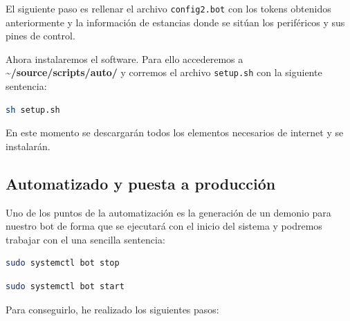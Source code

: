 El siguiente paso es rellenar el archivo \texttt{config2.bot} con los tokens obtenidos anteriormente y la información de estancias donde se sitúan los periféricos y sus pines de control.

Ahora instalaremos el software. Para ello accederemos a \textbf{\textasciitilde/source/scripts/auto/} y corremos el archivo \texttt{setup.sh} con la siguiente sentencia:
\begin{lstlisting}[language=sh,firstnumber=0]
sh setup.sh
\end{lstlisting}

En este momento se descargarán todos los elementos necesarios de internet y se instalarán.

\subsection{Automatizado y puesta a producción}
Uno de los puntos de la automatización es la generación de un demonio para nuestro bot de forma que se ejecutará con el inicio del sistema y podremos trabajar con el una sencilla sentencia:

\begin{lstlisting}[language=sh,firstnumber=0]
sudo systemctl bot stop
\end{lstlisting}
\begin{lstlisting}[language=sh]
sudo systemctl bot start 
\end{lstlisting}
Para conseguirlo, he realizado los siguientes pasos:

